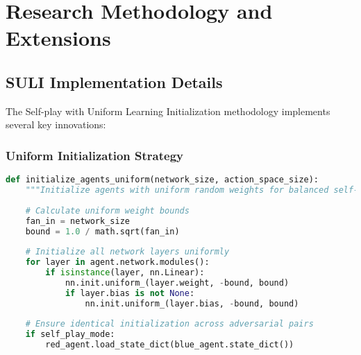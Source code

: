 \documentclass[12pt,a4paper]{article}
\begin{document}
\section{Research Methodology and Extensions}

\subsection{SULI Implementation Details}

The Self-play with Uniform Learning Initialization methodology implements several key innovations:

\subsubsection{Uniform Initialization Strategy}
\begin{lstlisting}[language=Python, caption=SULI Initialization]
def initialize_agents_uniform(network_size, action_space_size):
    """Initialize agents with uniform random weights for balanced self-play"""
    
    # Calculate uniform weight bounds
    fan_in = network_size
    bound = 1.0 / math.sqrt(fan_in)
    
    # Initialize all network layers uniformly
    for layer in agent.network.modules():
        if isinstance(layer, nn.Linear):
            nn.init.uniform_(layer.weight, -bound, bound)
            if layer.bias is not None:
                nn.init.uniform_(layer.bias, -bound, bound)
    
    # Ensure identical initialization across adversarial pairs
    if self_play_mode:
        red_agent.load_state_dict(blue_agent.state_dict())
\end{lstlisting}
\end{document}
